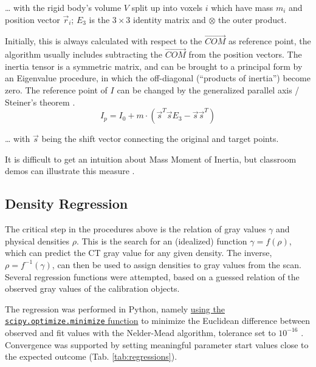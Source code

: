 \ldots{} with the rigid body's volume \(V\) split up into voxels \(i\) which have mass \(m_i\) and position vector \(\vec{r}_{i}\); \(E_{3}\) is the \(3\times 3\) identity matrix and \(\otimes\) the outer product.

Initially, this is always calculated with respect to the \(\vec{COM}\) as reference point, the algorithm usually includes subtracting the \(\vec{COM}\) from the position vectors.
The inertia tensor is a symmetric matrix, and can be brought to a principal form by an Eigenvalue procedure, in which the off-diagonal (``products of inertia'') become zero.
The reference point of \(I\) can be changed by the generalized parallel axis / Steiner's theorem \citep[][p. 245]{Lynch2017}.
\begin{equation}\label{eqn:steiner}
 I_{p} = I_{0} + m \cdot \left( \vec{s}^{T} \vec{s} E_{3} - \vec{s} \vec{s}^{T} \right)
\end{equation}

\ldots{} with \(\vec{s}\) being the shift vector connecting the original and target points.


It is difficult to get an intuition about Mass Moment of Inertia, but classroom demos can illustrate  this measure  \citep{Lewin801L19,LewinMOI,Lewin801L24}.


\subsection{Density Regression}
\label{sec:orgf2712a7}
The critical step in the procedures above is the relation of gray values \(\gamma\) and physical densities \(\rho\).
This is the search for an (idealized) function \(\gamma = f(\rho )\), which can predict the CT gray value for any given density.
The inverse, \(\rho = f^{-1}(\gamma )\), can then be used to assign densities to gray values from the scan.
Several regression functions were attempted, based on a guessed relation of the observed gray values of the calibration objects.

The regression was performed in Python, namely \href{https://docs.scipy.org/doc/scipy/reference/generated/scipy.optimize.minimize.html}{using the \texttt{scipy.optimize.minimize} function} to minimize the Euclidean difference between observed and fit values with the Nelder-Mead algorithm, tolerance set to \(10^{-16}\) \citep{Gao2012}.
Convergence was supported by setting meaningful parameter start values close to the expected outcome (Tab. \ref{tab:regressions}).

